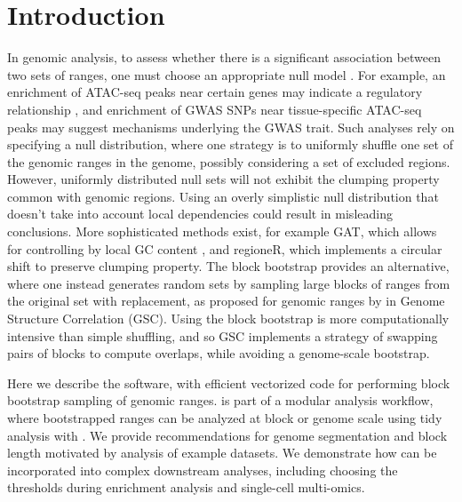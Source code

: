 \section{Introduction}

In genomic analysis, to assess whether
there is a significant association between two sets of ranges, 
one must choose an appropriate null model \citep{reviewdilemma2014,kanduri2018}.
For example, an enrichment of ATAC-seq peaks near certain genes
may indicate a regulatory relationship \citep{lee2020fluent}, 
and enrichment of GWAS SNPs near tissue-specific ATAC-seq peaks may
suggest mechanisms underlying the GWAS trait.
Such analyses rely on specifying a null distribution, where one
strategy is to uniformly shuffle one set of the
genomic ranges in the genome, possibly considering a set of
excluded regions.
However, uniformly distributed null sets will not exhibit the
clumping property common with genomic regions.
Using an overly simplistic null distribution that doesn't take into
account local dependencies could result in misleading conclusions.
More sophisticated methods exist, for example
GAT, which allows for controlling by local GC content
\citep{GAT_2013}, and regioneR, which implements a circular shift to
preserve clumping property\citep{gel2016regioner}.
The block bootstrap \citep{politis1999subsampling}
provides an alternative, where one instead generates
random sets by sampling large blocks of ranges from the
original set with replacement, as proposed for 
genomic ranges by \citet{bickel2010subsampling} in Genome Structure
Correlation (GSC).
Using the block bootstrap is more
computationally intensive than simple shuffling, and so GSC implements
a strategy of swapping pairs of blocks to compute overlaps, while
avoiding a genome-scale bootstrap.

Here we describe the \bootranges software, with efficient
vectorized code for performing block bootstrap sampling of genomic ranges.
\bootranges is part of a modular analysis workflow, where bootstrapped
ranges can be analyzed at block or genome scale using tidy
analysis with \plyranges \citep{lee2019plyranges}.
We provide recommendations for genome segmentation and block length
motivated by analysis of example datasets.
We demonstrate how \bootranges can be incorporated into complex
downstream analyses, including choosing the thresholds during
enrichment analysis and single-cell multi-omics.

\vspace*{-20pt}

